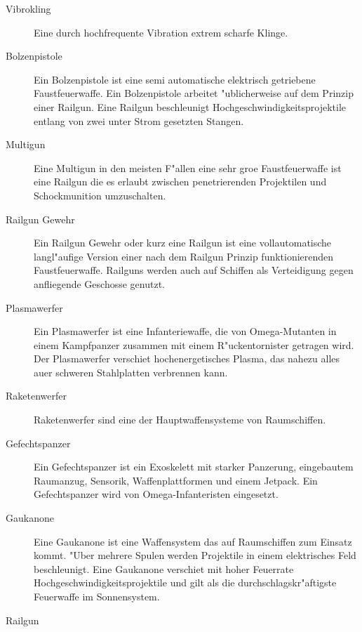 \begin{description}
\item [Vibrokling] Eine durch hochfrequente Vibration extrem scharfe Klinge.
\item [Bolzenpistole] Ein Bolzenpistole ist eine semi automatische elektrisch getriebene Faustfeuerwaffe. Ein Bolzenpistole arbeitet "ublicherweise auf  
      dem Prinzip einer Railgun. Eine Railgun beschleunigt Hochgeschwindigkeitsprojektile entlang von zwei unter Strom gesetzten Stangen.
\item [Multigun] Eine Multigun in den meisten F"allen eine sehr gro\3e Faustfeuerwaffe ist eine Railgun die es erlaubt zwischen     
      penetrierenden Projektilen und Schockmunition umzuschalten.
\item [Railgun Gewehr] Ein Railgun Gewehr oder kurz eine Railgun ist eine vollautomatische langl"aufige Version einer nach 
      dem Railgun Prinzip funktionierenden Faustfeuerwaffe. Railguns werden auch auf Schiffen als Verteidigung gegen anfliegende Geschosse genutzt.         
\item [Plasmawerfer] Ein Plasmawerfer ist eine Infanteriewaffe, die von Omega-Mutanten in einem Kampfpanzer zusammen mit
      einem R"uckentornister getragen wird. Der Plasmawerfer verschie\3t hochenergetisches Plasma, das nahezu alles au\3er schweren Stahlplatten verbrennen kann.
\item [Raketenwerfer] Raketenwerfer sind eine der Hauptwaffensysteme von Raumschiffen.      
\item [Gefechtspanzer] Ein Gefechtspanzer ist ein Exoskelett mit starker Panzerung, eingebautem Raumanzug, Sensorik,
      Waffenplattformen und einem Jetpack. Ein Gefechtspanzer wird von Omega-Infanteristen eingesetzt.
\item [Gau\3kanone] Eine Gau\3kanone ist eine Waffensystem das auf Raumschiffen zum Einsatz kommt. "Uber mehrere Spulen
      werden Projektile in einem elektrisches Feld beschleunigt. Eine Gau\3kanone verschie\3t mit hoher Feuerrate Hochgeschwindigkeitsprojektile und gilt als die durchschlagskr"aftigste Feuerwaffe im Sonnensystem.         
\end{description}

\begin{figure*}[htbp]
      \centering
      \newline{}Railgun
      \label{fig:rail-gun}
\end{figure*}

